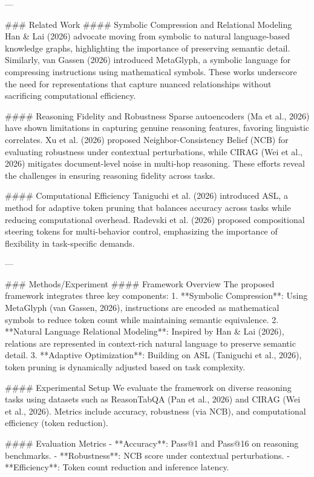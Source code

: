 ---

### Related Work
#### Symbolic Compression and Relational Modeling
Han & Lai (2026) advocate moving from symbolic to natural language-based knowledge graphs, highlighting the importance of preserving semantic detail. Similarly, van Gassen (2026) introduced MetaGlyph, a symbolic language for compressing instructions using mathematical symbols. These works underscore the need for representations that capture nuanced relationships without sacrificing computational efficiency.

#### Reasoning Fidelity and Robustness
Sparse autoencoders (Ma et al., 2026) have shown limitations in capturing genuine reasoning features, favoring linguistic correlates. Xu et al. (2026) proposed Neighbor-Consistency Belief (NCB) for evaluating robustness under contextual perturbations, while CIRAG (Wei et al., 2026) mitigates document-level noise in multi-hop reasoning. These efforts reveal the challenges in ensuring reasoning fidelity across tasks.

#### Computational Efficiency
Taniguchi et al. (2026) introduced ASL, a method for adaptive token pruning that balances accuracy across tasks while reducing computational overhead. Radevski et al. (2026) proposed compositional steering tokens for multi-behavior control, emphasizing the importance of flexibility in task-specific demands.

---

### Methods/Experiment
#### Framework Overview
The proposed framework integrates three key components:
1. **Symbolic Compression**: Using MetaGlyph (van Gassen, 2026), instructions are encoded as mathematical symbols to reduce token count while maintaining semantic equivalence.
2. **Natural Language Relational Modeling**: Inspired by Han & Lai (2026), relations are represented in context-rich natural language to preserve semantic detail.
3. **Adaptive Optimization**: Building on ASL (Taniguchi et al., 2026), token pruning is dynamically adjusted based on task complexity.

#### Experimental Setup
We evaluate the framework on diverse reasoning tasks using datasets such as ReasonTabQA (Pan et al., 2026) and CIRAG (Wei et al., 2026). Metrics include accuracy, robustness (via NCB), and computational efficiency (token reduction).

#### Evaluation Metrics
- **Accuracy**: Pass@1 and Pass@16 on reasoning benchmarks.
- **Robustness**: NCB score under contextual perturbations.
- **Efficiency**: Token count reduction and inference latency.

